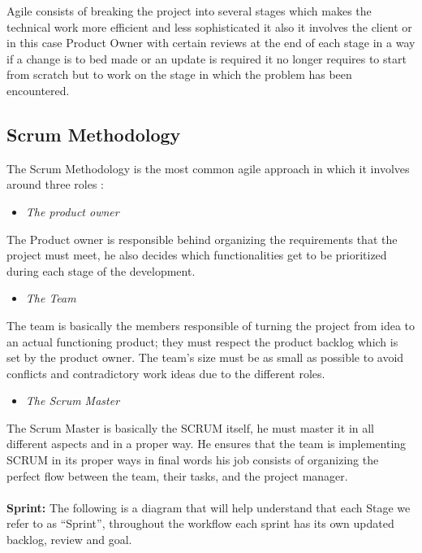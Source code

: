 \documentclass[]{report}
\begin{document}
Agile consists of breaking the project into several stages which makes the
technical work more efficient and less sophisticated it also it involves the client
or in this case Product Owner with certain reviews at the end of each stage in a
way if a change is to bed made or an update is required it no longer requires to
start from scratch but to work on the stage in which the problem has been
encountered.

\subsection{Scrum Methodology}
The Scrum Methodology is the most common agile approach in which it
involves around three roles :
\begin{itemize}
	\item \large{\emph{The product owner}}
\end{itemize}
The Product owner is responsible behind organizing the requirements that the
project must meet, he also decides which functionalities get to be prioritized
during each stage of the development.

\begin{itemize}
	\item \large{\emph{The Team}}
\end{itemize}

The team is basically the members responsible of turning the project from idea
to an actual functioning product; they must respect the product backlog which is
set by the product owner. The team’s size must be as small as possible to avoid
conflicts and contradictory work ideas due to the different roles.

\begin{itemize}
	\item \large{\emph{The Scrum Master}}
\end{itemize}

The Scrum Master is basically the SCRUM itself, he must master it in all
different aspects and in a proper way. He ensures that the team is implementing
SCRUM in its proper ways in final words his job consists of organizing the
perfect flow between the team, their tasks, and the project manager.\\ \\
\textbf{Sprint:} The following is a diagram that will help understand that each Stage we
refer to as “Sprint”, throughout the workflow each sprint has its own updated
backlog, review and goal.
\end{document}
